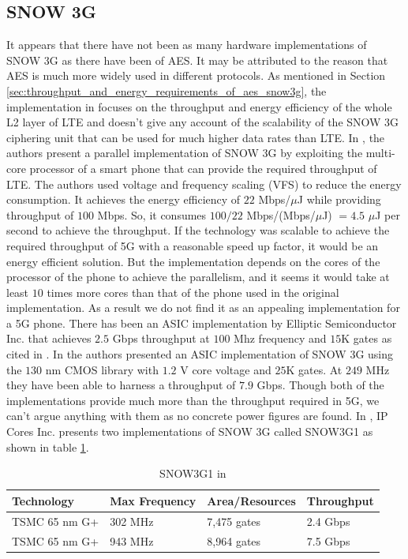 \documentclass[lnicst,sechang,a4paper]{svmultln}
\begin{document}
\subsection{SNOW 3G}
\label{sub-sec:snow3gp}
It appears that there have not been as many hardware implementations of SNOW 3G as there have been of AES. It may be attributed to the reason that AES is much more widely used in different protocols. As mentioned in Section \ref{sec:throughput_and_energy_requirements_of_aes_snow3g}, the implementation in \cite{IIS_Ruhr_2010} focuses on the throughput and energy efficiency of the whole L2 layer of LTE and doesn't give any account of the scalability of the SNOW 3G ciphering unit that can be used for much higher data rates than LTE. In \cite{IEEE_ICCT_2010}, the authors present a parallel implementation of SNOW 3G by exploiting the multi-core processor of a smart phone that can provide the required throughput of LTE. The authors used voltage and frequency scaling (VFS) to reduce the energy consumption. It achieves the energy efficiency of $22$ Mbps/$\mu$J while providing throughput of $100$ Mbps. So, it consumes $100/22$ Mbps/(Mbps/$\mu$J) $ = 4.5$ $\mu$J per second to achieve the throughput. If the technology was scalable to achieve the required throughput of 5G with a reasonable speed up factor, it would be an energy efficient solution. But the implementation depends on the cores of the processor of the phone to achieve the parallelism, and it seems it would take at least $10$ times more cores than that of the phone used in the original implementation. As a result we do not find it as an appealing implementation for a 5G phone. There has been an ASIC implementation by Elliptic Semiconductor Inc. that achieves $2.5$ Gbps throughput at $100$ Mhz frequency and $15$K gates as cited in \cite{Greece_SNOW3G}. In \cite{Greece_SNOW3G} the authors presented an ASIC implementation of SNOW 3G using the $130$ nm CMOS library with $1.2$ V core voltage and $25$K gates. At $249$ MHz they have been able to harness a throughput of $7.9$ Gbps. Though both of the implementations provide much more than the throughput required in 5G, we can't argue anything with them as no concrete power figures are found. In \cite{IP_cores}, IP Cores Inc. presents two implementations of SNOW 3G called SNOW3G1 as shown in table \ref{table:snow3g_implementation}.
\begin{table}
\begin{center}
\begin{tabular}{|p{}
				|p{}
				|p{}
				|p{}|				
				}
\hline
Technology & Max Frequency & Area/Resources & Throughput \\
\hline
TSMC 65 nm G+ & 302 MHz & 7,475 gates & 2.4 Gbps \\ \hline
TSMC 65 nm G+ & 943 MHz & 8,964 gates & 7.5 Gbps \\ \hline
\end{tabular}
\end{center}
\caption{SNOW3G1 in \cite{IP_cores}}
\label{table:snow3g_implementation}
\end{table}
\end{document}
